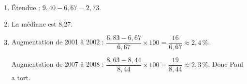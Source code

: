 
\medskip

\begin{enumerate}
\item Étendue : $9,40 - 6,67 = 2,73$.
\item La médiane est 8,27.
\item Augmentation de 2001 à 2002 : $\dfrac{6,83 - 6,67}{6,67} \times 100 = \dfrac{16}{6,67} \approx 2,4\,\%$.

Augmentation de 2007 à 2008 : $\dfrac{8,63 - 8,44}{8,44} \times 100 = \dfrac{19}{8,44} \approx 2,3\,\%$. Donc Paul a tort.
\end{enumerate}

\medskip


